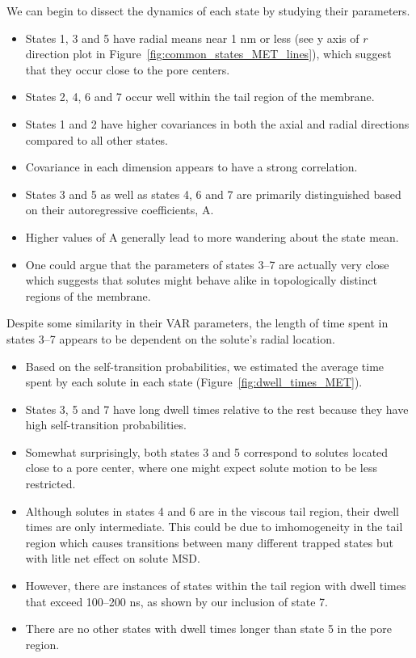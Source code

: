 \documentclass{article}
\begin{document}
  \noindent We can begin to dissect the dynamics of each state by studying their parameters.
  \begin{itemize}
    \item States 1, 3 and 5 have radial means near 1 nm or less (see y axis of $r$ direction plot in
    Figure~\ref{fig:common_states_MET_lines}), which suggest that they occur
    close to the pore centers. 
    \item States 2, 4, 6 and 7 occur well within the tail region of the membrane.
    \item States 1 and 2 have higher covariances in both the axial and radial
    directions compared to all other states.
    \item Covariance in each dimension appears to have a strong correlation.
    \item States 3 and 5 as well as states 4, 6 and 7 are primarily distinguished based
    on their autoregressive coefficients, A. 
    \item Higher values of A generally lead to more wandering about the state mean.
    \item One could argue that the parameters of states 3--7 are actually very close which
    suggests that solutes might behave alike in topologically distinct regions of the 
    membrane.
  \end{itemize}

  Despite some similarity in their VAR parameters, the length of time spent in states 3--7 
  appears to be dependent on the solute's radial location.
  \begin{itemize}
    \item Based on the self-transition probabilities, we estimated the average time
    spent by each solute in each state (Figure~\ref{fig:dwell_times_MET}).
    \item States 3, 5 and 7 have long dwell times relative to the rest because
    they have high self-transition probabilities.
    \item Somewhat surprisingly, both states 3 and 5 correspond to solutes located close to
    a pore center, where one might expect solute motion to be less restricted.
    \item Although solutes in states 4 and 6 are in the viscous tail region, their
    dwell times are only intermediate. This could be due to imhomogeneity in the
    tail region which causes transitions between many different trapped states but
    with litle net effect on solute MSD. 
    \item However, there are instances of states within the tail region with dwell 
    times that exceed 100--200 ns, as shown by our inclusion of state 7.
    \item There are no other states with dwell times longer than state 5 in the pore 
    region.
  \end{itemize} 
  
\end{document}

